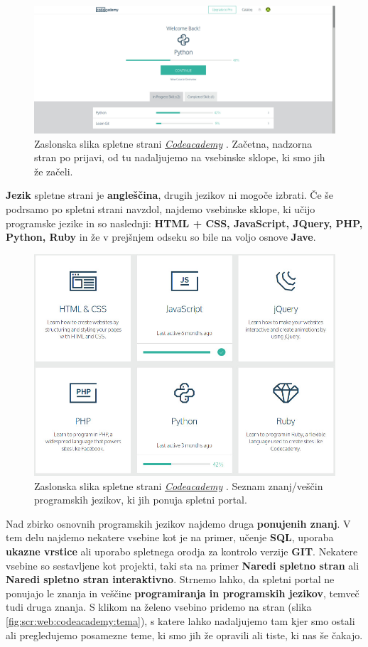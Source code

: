 \begin{figure}[h!]
  \centering
    \includegraphics [width=0.65\linewidth, keepaspectratio =
    1] {./images/sc_web/codeacademy_login_01.jpg}
    \caption{Zaslonska slika spletne strani
      \emph{\href{https://www.codecademy.com/}{Codeacademy}}
      \cite{web:codeacademy}. Začetna, nadzorna stran po prijavi, od
      tu nadaljujemo na vsebinske sklope, ki smo jih že začeli.}
    \label{fig:scr:web:codeacademy}
\end{figure}

\textbf{Jezik} spletne strani je \textbf{angleščina}, drugih jezikov ni
mogoče izbrati. Če še podrsamo po spletni strani navzdol, najdemo
vsebinske sklope, ki učijo programske jezike in so naslednji: \textbf{HTML +
  CSS, JavaScript, JQuery, PHP, Python, Ruby} in že v prejšnjem odseku
so bile na voljo osnove \textbf{Jave}.

\begin{figure}[h!]
  \centering
    \includegraphics [width=0.65\linewidth, keepaspectratio =
    1] {./images/sc_web/codeacademy_vescine_02.jpg}
    \caption{Zaslonska slika spletne strani
      \emph{\href{https://www.codecademy.com/}{Codeacademy}}
      \cite{web:codeacademy}. Seznam znanj/veščin programskih jezikov,
      ki jih ponuja spletni portal.}
    \label{fig:scr:web:codeacademy:vescine-prog}
\end{figure}

Nad zbirko osnovnih programskih jezikov najdemo druga
\textbf{ponujenih znanj}. V tem delu najdemo nekatere vsebine kot je
na primer, učenje \textbf{SQL}, uporaba \textbf{ukazne vrstice} ali
uporabo spletnega orodja za kontrolo verzije \textbf{GIT}. Nekatere
vsebine so sestavljene kot projekti, taki sta na primer \textbf{Naredi
  spletno stran} ali \textbf{Naredi spletno stran interaktivno}. 
Strnemo lahko, da spletni portal ne ponujajo le znanja in veščine
\textbf{programiranja in programskih jezikov}, temveč tudi druga
znanja. S klikom na želeno vsebino pridemo na stran (slika
\ref{fig:scr:web:codeacademy:tema}), s katere lahko nadaljujemo tam
kjer smo ostali ali pregledujemo posamezne teme, ki smo jih že
opravili ali tiste, ki nas še čakajo.


